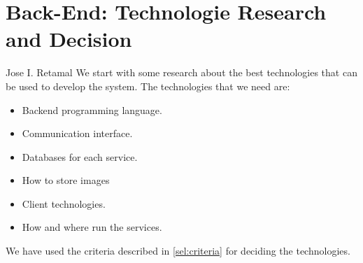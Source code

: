 \section{Back-End: Technologie Research and Decision }
Jose I. Retamal
\vskip 0.1in
\indent
\indent
We start with some research about the best technologies that can be used to develop the system. The technologies that we need are:
\begin{itemize}
	\item Backend programming language.
	\item  Communication interface.
	\item  Databases for each service.
	\item  How to store images
	\item  Client technologies.
	\item  How and where run the services.
\end{itemize}



We have used the criteria described in \ref{sel:criteria} for deciding the technologies.
